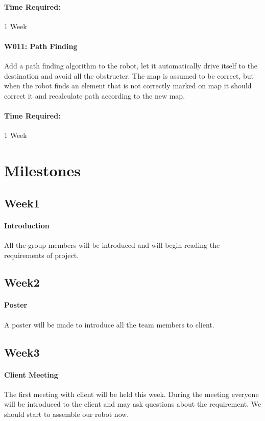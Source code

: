 \documentclass[11pt, a4paper]{report}
\begin{document}
\paragraph{Time Required:}1 Week\\




\paragraph{W011: Path Finding}
Add a path finding algorithm to the robot, let it automatically drive itself to the destination and avoid all the obstructer. The map is assumed to be correct, but when the robot finds an element that is not correctly marked on map it should correct it and recalculate path according to the new map.
\paragraph{Time Required:}1 Week\\




\section{Milestones}
\subsection{Week1}
\paragraph{Introduction}
All the group members will be introduced and will begin reading the requirements of project.


\subsection{Week2}
\paragraph{Poster}
A poster will be made to introduce all the team members to client.

\subsection{Week3}
\paragraph{Client Meeting}
 The first meeting with client will be held this week. During the meeting everyone will be introduced to the client and may ask questions about the requirement. We should start to assemble our robot now.
 
\end{document}
